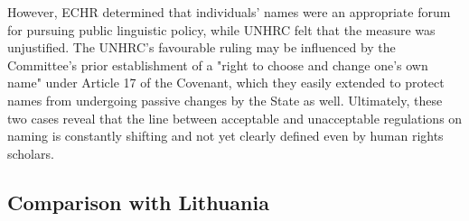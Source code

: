 However, ECHR determined that individuals' names were an appropriate forum for
pursuing public linguistic policy, while UNHRC felt that the measure was
unjustified. The UNHRC's favourable ruling may be influenced by the Committee's
prior establishment of a "right to choose and change one's own name" under
Article 17 of the Covenant, which they easily extended to protect names from
undergoing passive changes by the State as well. Ultimately, these two cases
reveal that the line between acceptable and unacceptable regulations on naming
is constantly shifting and not yet clearly defined even by human rights
scholars.

\subsection{Comparison with Lithuania}
